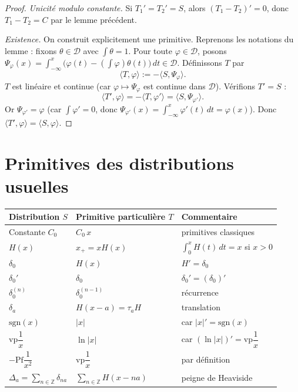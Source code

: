 \documentclass[12pt,a4paper,openany]{book}
\theoremstyle{definition}
\theoremstyle{plain}
\theoremstyle{remark}
\begin{document}
	\begin{proof}
		\emph{Unicité modulo constante.} Si $T_1' = T_2' = S$, alors $(T_1 - T_2)' = 0$, donc $T_1 - T_2 = C$ par le lemme précédent.
		
		\emph{Existence.} On construit explicitement une primitive. Reprenons les notations du lemme : fixons $\theta \in \mathcal{D}$ avec $\int\theta = 1$.
		Pour toute $\varphi \in \mathcal{D}$, posons $\Psi_\varphi(x) = \int_{-\infty}^x\bigl(\varphi(t) - (\int\varphi)\theta(t)\bigr)\,dt \in \mathcal{D}$.
		Définissons $T$ par
		\[
		\langle T, \varphi\rangle := -\langle S, \Psi_\varphi\rangle.
		\]
		$T$ est linéaire et continue (car $\varphi \mapsto \Psi_\varphi$ est continue dans $\mathcal{D}$). Vérifions $T' = S$ :
		\[
		\langle T', \varphi\rangle = -\langle T, \varphi'\rangle = \langle S, \Psi_{\varphi'}\rangle.
		\]
		Or $\Psi_{\varphi'} = \varphi$ (car $\int\varphi' = 0$, donc $\Psi_{\varphi'}(x) = \int_{-\infty}^x\varphi'(t)\,dt = \varphi(x)$). Donc $\langle T', \varphi\rangle = \langle S, \varphi\rangle$.
	\end{proof}
	
	\section{Primitives des distributions usuelles}
	
	\begin{theorem}
		\mbox{}
		
		\begin{center}
			\renewcommand{\arraystretch}{1.6}
			\begin{tabular}{@{}lll@{}}
				\toprule
				\textbf{Distribution $S$} & \textbf{Primitive particulière $T$} & \textbf{Commentaire} \\
				\midrule
				Constante $C_0$ & $C_0\,x$ & primitives classiques \\
				$H(x)$ & $x_+ = x H(x)$ & $\int_0^x H(t)\,dt = x$ si $x > 0$ \\
				$\delta_0$ & $H(x)$ & $H' = \delta_0$ \\
				$\delta_0'$ & $\delta_0$ & $\delta_0' = (\delta_0)'$ \\
				$\delta_0^{(n)}$ & $\delta_0^{(n-1)}$ & récurrence \\
				$\delta_a$ & $H(x-a) = \tau_a H$ & translation \\
				$\mathrm{sgn}(x)$ & $|x|$ & car $|x|' = \mathrm{sgn}(x)$ \\
				$\mathrm{vp}\dfrac{1}{x}$ & $\ln|x|$ & car $(\ln|x|)' = \mathrm{vp}\dfrac{1}{x}$ \\
				$-\mathrm{Pf}\dfrac{1}{x^2}$ & $\mathrm{vp}\dfrac{1}{x}$ & par définition \\
				$\Delta_a = \displaystyle\sum_{n\in\mathbb{Z}}\delta_{na}$ & $\displaystyle\sum_{n\in\mathbb{Z}}H(x-na)$ & peigne de Heaviside \\
				\bottomrule
			\end{tabular}
		\end{center}
		\renewcommand{\arraystretch}{1}
	\end{theorem}
	
\end{document}
